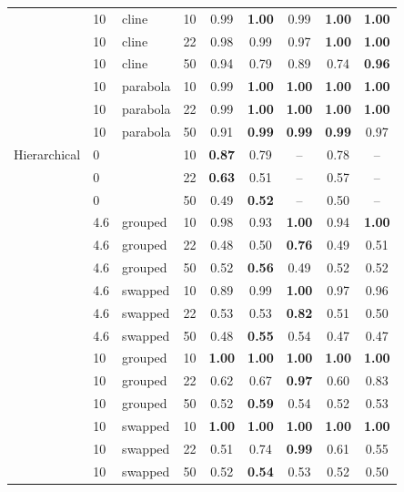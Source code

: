 \begin{table}[ht]
\begin{tabular}{lllrccccc}
 & 10 & cline & 10 & 0.99 & \textbf{1.00} & 0.99 & \textbf{1.00} & \textbf{1.00} \\
 & 10 & cline & 22 & 0.98 & 0.99 & 0.97 & \textbf{1.00} & \textbf{1.00} \\
 & 10 & cline & 50 & 0.94 & 0.79 & 0.89 & 0.74 & \textbf{0.96} \\
 & 10 & parabola & 10 & 0.99 & \textbf{1.00} & \textbf{1.00} & \textbf{1.00} & \textbf{1.00} \\
 & 10 & parabola & 22 & 0.99 & \textbf{1.00} & \textbf{1.00} & \textbf{1.00} & \textbf{1.00} \\
 & 10 & parabola & 50 & 0.91 & \textbf{0.99} & \textbf{0.99} & \textbf{0.99} & 0.97 \\
\midrule
Hierarchical & 0 &  & 10 & \textbf{0.87} & 0.79 & -- & 0.78 & -- \\
 & 0 &  & 22 & \textbf{0.63} & 0.51 & -- & 0.57 & -- \\
 & 0 &  & 50 & 0.49 & \textbf{0.52} & -- & 0.50 & -- \\
 & 4.6 & grouped & 10 & 0.98 & 0.93 & \textbf{1.00} & 0.94 & \textbf{1.00} \\
 & 4.6 & grouped & 22 & 0.48 & 0.50 & \textbf{0.76} & 0.49 & 0.51 \\
 & 4.6 & grouped & 50 & 0.52 & \textbf{0.56} & 0.49 & 0.52 & 0.52 \\
 & 4.6 & swapped & 10 & 0.89 & 0.99 & \textbf{1.00} & 0.97 & 0.96 \\
 & 4.6 & swapped & 22 & 0.53 & 0.53 & \textbf{0.82} & 0.51 & 0.50 \\
 & 4.6 & swapped & 50 & 0.48 & \textbf{0.55} & 0.54 & 0.47 & 0.47 \\
 & 10 & grouped & 10 & \textbf{1.00} & \textbf{1.00} & \textbf{1.00} & \textbf{1.00} & \textbf{1.00} \\
 & 10 & grouped & 22 & 0.62 & 0.67 & \textbf{0.97} & 0.60 & 0.83 \\
 & 10 & grouped & 50 & 0.52 & \textbf{0.59} & 0.54 & 0.52 & 0.53 \\
 & 10 & swapped & 10 & \textbf{1.00} & \textbf{1.00} & \textbf{1.00} & \textbf{1.00} & \textbf{1.00} \\
 & 10 & swapped & 22 & 0.51 & 0.74 & \textbf{0.99} & 0.61 & 0.55 \\
 & 10 & swapped & 50 & 0.52 & \textbf{0.54} & 0.53 & 0.52 & 0.50 \\
\bottomrule
\end{tabular}
\end{table}
